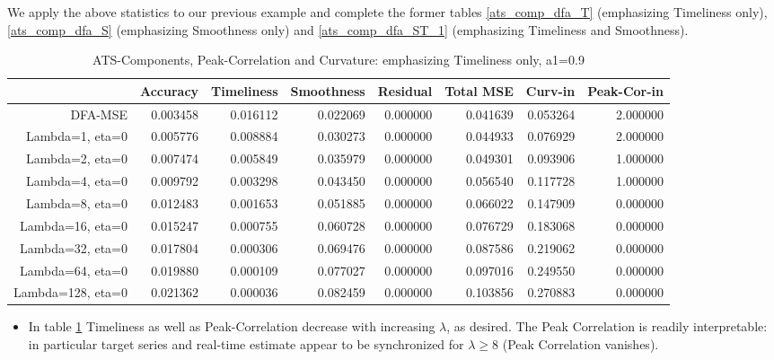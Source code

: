 \documentclass[a4paper]{book}
\begin{document}
We apply the above statistics to our previous example and complete the former tables \ref{ats_comp_dfa_T} (emphasizing Timeliness only), \ref{ats_comp_dfa_S} (emphasizing Smoothness only) and \ref{ats_comp_dfa_ST_1} (emphasizing Timeliness and Smoothness). 
\begin{table}[ht]
\centering
\begin{tabular}{rrrrrrrr}
  \hline
 & Accuracy & Timeliness & Smoothness & Residual & Total MSE & Curv-in & Peak-Cor-in \\ 
  \hline
DFA-MSE & 0.003458 & 0.016112 & 0.022069 & 0.000000 & 0.041639 & 0.053264 & 2.000000 \\ 
  Lambda=1, eta=0 & 0.005776 & 0.008884 & 0.030273 & 0.000000 & 0.044933 & 0.076929 & 2.000000 \\ 
  Lambda=2, eta=0 & 0.007474 & 0.005849 & 0.035979 & 0.000000 & 0.049301 & 0.093906 & 1.000000 \\ 
  Lambda=4, eta=0 & 0.009792 & 0.003298 & 0.043450 & 0.000000 & 0.056540 & 0.117728 & 1.000000 \\ 
  Lambda=8, eta=0 & 0.012483 & 0.001653 & 0.051885 & 0.000000 & 0.066022 & 0.147909 & 0.000000 \\ 
  Lambda=16, eta=0 & 0.015247 & 0.000755 & 0.060728 & 0.000000 & 0.076729 & 0.183068 & 0.000000 \\ 
  Lambda=32, eta=0 & 0.017804 & 0.000306 & 0.069476 & 0.000000 & 0.087586 & 0.219062 & 0.000000 \\ 
  Lambda=64, eta=0 & 0.019880 & 0.000109 & 0.077027 & 0.000000 & 0.097016 & 0.249550 & 0.000000 \\ 
  Lambda=128, eta=0 & 0.021362 & 0.000036 & 0.082459 & 0.000000 & 0.103856 & 0.270883 & 0.000000 \\ 
   \hline
\end{tabular}
\caption{ATS-Components, Peak-Correlation and Curvature: emphasizing Timeliness only, a1=0.9} 
\label{ats_comp_dfa_T_1_pc}
\end{table}\begin{itemize}
\item In table \ref{ats_comp_dfa_T_1_pc} Timeliness as well as Peak-Correlation decrease with increasing $\lambda$, as desired. The Peak Correlation is readily interpretable: in particular target series and real-time estimate appear to be  synchronized for $\lambda\geq 8$ (Peak Correlation vanishes).
\begin{table}[ht]

\end{table}
\end{itemize}
\end{document}
